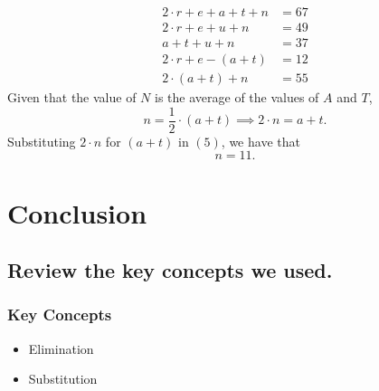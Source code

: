 \documentclass{beamer} %
\begin{document}
\setcounter{equation}{0}

\begin{frame}
  \begin{align}
    2\cdot r+e+a+t+n &= 67 \\
    2\cdot r+e+u+n &= 49   \\
    a+t+u+n &= 37          \\
    2\cdot r+e-(a+t) &= 12 \\
    2\cdot(a+t)+n &= 55
  \end{align}
  Given that the value of $N$ is the average of the values of $A$ and $T$,
  \[
    n=\frac{1}{2}\cdot(a+t) \implies 2 \cdot n = a + t.
  \]
  Substituting $2\cdot n$ for $(a+t)$ in $(5)$, we have that
  \[
    n = \boxed{11}.
  \]
\end{frame}

\setcounter{equation}{0}

\section{Conclusion}

\subsection*{Review the key concepts we used.}

\begin{frame}
  \frametitle{Key Concepts}
  \pause
  \begin{itemize}
  \item Elimination \pause
  \item Substitution
  \end{itemize}
\end{frame}

\end{document}
